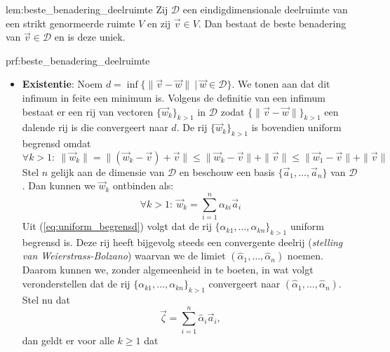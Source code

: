 \begin{lem}{lem:beste_benadering_deelruimte}
    Zij $\mathcal{D}$ een eindigdimensionale deelruimte van een strikt genormeerde ruimte $V$ en zij $\vec{v} \in V$. Dan bestaat de beste benadering van $\vec{v} \in \mathcal{D}$ en is deze uniek.  
\end{lem}

\begin{prf}{prf:beste_benadering_deelruimte}
    \begin{itemize}
        \item 
            \textbf{Existentie}: Noem $d = \inf\{\|\vec{v}-\vec{w}\| \ | \ \vec{w} \in \mathcal{D}\}$. We tonen aan dat dit infimum in feite een minimum is. Volgens de definitie van een infimum bestaat er een rij van vectoren $\{\vec{w}_k\}_{k>1}$ in $\mathcal{D}$ zodat $\{\|\vec{v}-\vec{w}\|\}_{k>1}$ een dalende rij is die convergeert naar $d$. De rij $\{\vec{w}_k\}_{k>1}$ is bovendien uniform begrensd omdat 
            \begin{equation}
                \forall k > 1: \ \|\vec{w}_k\| = \|(\vec{w}_k - \vec{v}) + \vec{v}\| \leq \|\vec{w}_k - \vec{v}\| + \|\vec{v}\| \leq \|\vec{w}_1 - \vec{v}\| + \|\vec{v}\|
                \label{eq:uniform_begrensd}
            \end{equation}
            Stel $n$ gelijk aan de dimensie van $\mathcal{D}$ en beschouw een basis $\{\vec{a}_1,\ldots,\vec{a}_n\}$ van $\mathcal{D}$. Dan kunnen we $\vec{w}_k$ ontbinden als:
            \begin{equation*}
                \forall k > 1: \ \vec{w}_k = \sum_{i=1}^n \alpha_{ki}\vec{a}_i 
            \end{equation*}
            Uit (\ref{eq:uniform_begrensd}) volgt dat de rij $\{\alpha_{k1},\ldots,\alpha_{kn}\}_{k>1}$ uniform begrensd is. Deze rij heeft bijgevolg steeds een convergente deelrij (\emph{stelling van Weierstrass-Bolzano}) waarvan we de limiet $(\hat{\alpha}_1,\ldots,\hat{\alpha}_n)$ noemen. Daarom kunnen we, zonder algemeenheid in te boeten, in wat volgt veronderstellen dat de rij $\{\alpha_{k1},\ldots,\alpha_{kn}\}_{k>1}$ convergeert naar $(\hat{\alpha}_1,\ldots,\hat{\alpha}_n)$. Stel nu dat
            \begin{equation*}
                \vec{\zeta} = \sum_{i=1}^{n} \hat{\alpha}_i \vec{a}_i,
            \end{equation*} 
            dan geldt er voor alle $k\geq1$ dat 
            \begin{equation*}

\end{equation*}
\end{itemize}
\end{prf}

